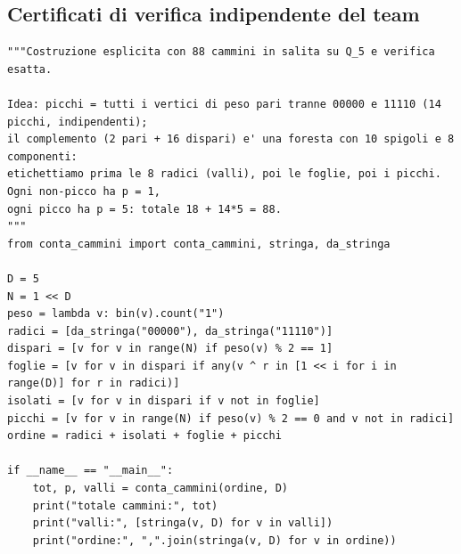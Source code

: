 \documentclass[11pt,a4paper]{article}
\begin{document}
\subsection{Certificati di verifica indipendente del team}
\begin{lstlisting}[caption={certificati/costruzione\_88.py}]
"""Costruzione esplicita con 88 cammini in salita su Q_5 e verifica esatta.

Idea: picchi = tutti i vertici di peso pari tranne 00000 e 11110 (14 picchi, indipendenti);
il complemento (2 pari + 16 dispari) e' una foresta con 10 spigoli e 8 componenti:
etichettiamo prima le 8 radici (valli), poi le foglie, poi i picchi. Ogni non-picco ha p = 1,
ogni picco ha p = 5: totale 18 + 14*5 = 88.
"""
from conta_cammini import conta_cammini, stringa, da_stringa

D = 5
N = 1 << D
peso = lambda v: bin(v).count("1")
radici = [da_stringa("00000"), da_stringa("11110")]
dispari = [v for v in range(N) if peso(v) % 2 == 1]
foglie = [v for v in dispari if any(v ^ r in [1 << i for i in range(D)] for r in radici)]
isolati = [v for v in dispari if v not in foglie]
picchi = [v for v in range(N) if peso(v) % 2 == 0 and v not in radici]
ordine = radici + isolati + foglie + picchi

if __name__ == "__main__":
    tot, p, valli = conta_cammini(ordine, D)
    print("totale cammini:", tot)
    print("valli:", [stringa(v, D) for v in valli])
    print("ordine:", ",".join(stringa(v, D) for v in ordine))

\end{lstlisting}
\end{document}
